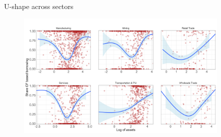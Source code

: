 \documentclass[notes]{beamer}
\begin{document}
\begin{frame}[label=U_sector]{U-shape across sectors}
\begin{figure}[H]  %
    \centering
    \includegraphics[width=0.9\textwidth]{presentations/smoothy1.png}
\end{figure}
\begin{center}
\hyperlink{slide3}{}
\end{center}
\end{frame}
\end{document}
